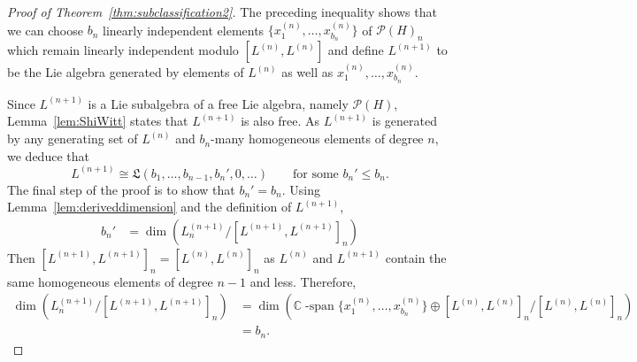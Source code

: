 \documentclass[11pt]{amsart}
\theoremstyle{definition}
\numberwithin{equation}{section}
\def\CC{{\mathbb C}}
\begin{document}
\begin{proof}[Proof of Theorem~\ref{thm:subclassification2}]
The preceding inequality shows that we can choose $b_{n}$ linearly independent elements $\{x^{(n)}_{1}, \ldots, x^{(n)}_{b_{n}}\}$ of $\mathcal{P}(H)_{n}$ which remain linearly independent modulo $[L^{(n)}, L^{(n)}]$ and define $L^{(n+1)}$ to be the Lie algebra generated by  elements of $L^{(n)}$ as well as $x^{(n)}_{1}, \ldots, x^{(n)}_{b_{n}}$.

Since $L^{(n+1)}$ is a Lie subalgebra of a free Lie algebra, namely $\mathcal{P}(H)$, Lemma~\ref{lem:ShiWitt} states that $L^{(n+1)}$ is also free.  
As $L^{(n+1)}$ is generated by any generating set of $L^{(n)}$ and $b_{n}$-many homogeneous elements of degree $n$, we deduce that
\[
L^{(n+1)} \cong \mathfrak{L}(b_{1}, \ldots, b_{n-1}, b_{n}', 0, \ldots )
\qquad\text{for some $b_{n}' \le b_{n}$}.
\]
The final step of the proof is to show that $b_{n}' = b_{n}$.  Using Lemma~\ref{lem:deriveddimension} and the definition of $L^{(n+1)}$,
\begin{align*}
b_{n}' &= \dim\left( L^{(n+1)}_{n} \big/ [L^{(n+1)}, L^{(n+1)}]_{n}\right)%
\end{align*}
Then $[L^{(n+1)}, L^{(n+1)}]_{n} = [L^{(n)}, L^{(n)}]_{n}$ as $L^{(n)}$ and $L^{(n+1)}$ contain the same homogeneous elements of degree $n - 1$ and less.  Therefore,
\begin{align*}
 \dim\!\left( L^{(n+1)}_{n} \big/ [L^{(n+1)}, L^{(n+1)}]_{n}\right) 
&= \dim\!\left(  \CC\operatorname{-span}\{x^{(n)}_{1}, \ldots, x^{(n)}_{b_{n}}\} \oplus [L^{(n)}, L^{(n)}]_{n} \big/ [L^{(n)}, L^{(n)}]_{n} \right) \\
&= b_{n}.
\end{align*}
\end{proof}
\end{document}
